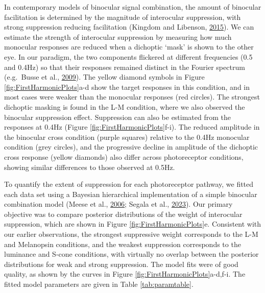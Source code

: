 \documentclass[
]{article}
\begin{document}
In contemporary models of binocular signal combination, the amount of binocular facilitation is determined by the magnitude of interocular suppression, with strong suppression reducing facilitation (Kingdom and Libenson, \protect\hyperlink{ref-Kingdom2015}{2015}). We can estimate the strength of interocular suppression by measuring how much monocular responses are reduced when a dichoptic `mask' is shown to the other eye. In our paradigm, the two components flickered at different frequencies (0.5 and 0.4Hz) so that their responses remained distinct in the Fourier spectrum (e.g.~Busse et al., \protect\hyperlink{ref-Busse2009}{2009}). The yellow diamond symbols in Figure \ref{fig:FirstHarmonicPlots}a-d show the target responses in this condition, and in most cases were weaker than the monocular responses (red circles). The strongest dichoptic masking is found in the L-M condition, where we also observed the binocular suppression effect. Suppression can also be estimated from the responses at 0.4Hz (Figure \ref{fig:FirstHarmonicPlots}f-i). The reduced amplitude in the binocular cross condition (purple squares) relative to the 0.4Hz monocular condition (grey circles), and the progressive decline in amplitude of the dichoptic cross response (yellow diamonds) also differ across photoreceptor conditions, showing similar differences to those observed at 0.5Hz.

To quantify the extent of suppression for each photoreceptor pathway, we fitted each data set using a Bayesian hierarchical implementation of a simple binocular combination model (Meese et al., \protect\hyperlink{ref-Meese2006}{2006}; Segala et al., \protect\hyperlink{ref-Segala2023}{2023}). Our primary objective was to compare posterior distributions of the weight of interocular suppression, which are shown in Figure \ref{fig:FirstHarmonicPlots}e. Consistent with our earlier observations, the strongest suppressive weight corresponds to the L-M and Melanopsin conditions, and the weakest suppression corresponds to the luminance and S-cone conditions, with virtually no overlap between the posterior distributions for weak and strong suppression. The model fits were of good quality, as shown by the curves in Figure \ref{fig:FirstHarmonicPlots}a-d,f-i. The fitted model parameters are given in Table \ref{tab:paramtable}.
\end{document}
